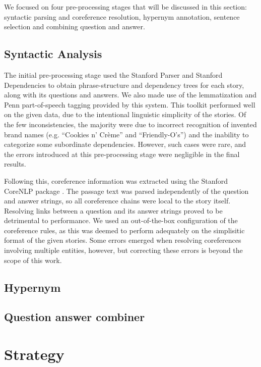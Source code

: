 \documentclass[11pt]{article}
\begin{document}
We focused on four pre-processing stages that will be discussed in this section:
syntactic parsing and coreference resolution, hypernym annotation, sentence selection and combining question and answer.


\subsection{Syntactic Analysis}


The initial pre-processing stage used the Stanford Parser \cite{stanford_parser} and Stanford Dependencies \cite{de2008stanford} to obtain phrase-structure and dependency trees for each story, along with its questions and answers. We also made use of the lemmatization and Penn part-of-speech tagging \cite{marcus1993building} provided by this system. This toolkit performed well on the given data, due to the intentional linguistic simplicity of the stories. Of the few inconsistencies, the majority were due to incorrect recognition of invented brand names (e.g. “Cookies n’ Crème” and “Friendly-O’s”) and the inability to categorize some subordinate dependencies. However, such cases were rare, and the errors introduced at this pre-processing stage were negligible in the final results.

Following this, coreference information was extracted using the Stanford CoreNLP package \cite{manning2014stanford}. The passage text was parsed independently of the question and answer strings, so all coreference chains were local to the story itself. Resolving links between a question and its answer strings proved to be detrimental to performance. We used an out-of-the-box configuration of the coreference rules, as this was deemed to perform adequately on the simplisitic format of the given stories. Some errors emerged when resolving coreferences involving multiple entities, however, but correcting these errors is beyond the scope of this work.
\subsection{Hypernym}

\subsection{Question answer combiner}

\section{Strategy}
\end{document}

